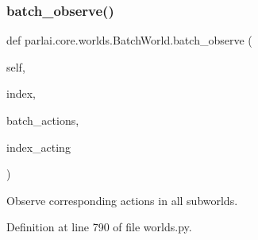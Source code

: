 \subsubsection{\texorpdfstring{batch\+\_\+observe()}{batch\_observe()}}
{\footnotesize\ttfamily def parlai.\+core.\+worlds.\+Batch\+World.\+batch\+\_\+observe (\begin{DoxyParamCaption}\item[{}]{self,  }\item[{}]{index,  }\item[{}]{batch\+\_\+actions,  }\item[{}]{index\+\_\+acting }\end{DoxyParamCaption})}

\begin{DoxyVerb}Observe corresponding actions in all subworlds.
\end{DoxyVerb}
 

Definition at line 790 of file worlds.\+py.


